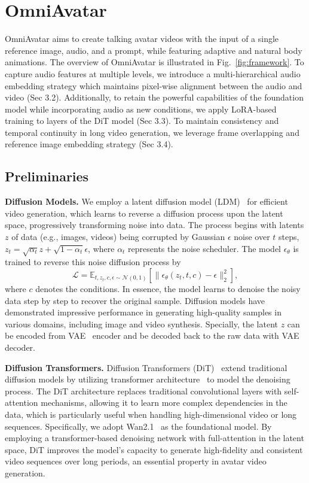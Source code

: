 \section{OmniAvatar}


OmniAvatar aims to create talking avatar videos with the input of a single reference image, audio, and a prompt, while featuring adaptive and natural body animations. The overview of OmniAvatar is illustrated in Fig.~\ref{fig:framework}. To capture audio features at multiple levels,  we introduce a multi-hierarchical audio embedding strategy which maintains pixel-wise alignment between the audio and video (Sec 3.2). Additionally, to retain the powerful capabilities of the foundation model while incorporating audio as new conditions, we apply LoRA-based training to layers of the DiT model (Sec 3.3). To maintain consistency and temporal continuity in long video generation, we leverage frame overlapping and reference image embedding strategy (Sec 3.4).


\subsection{Preliminaries}
\noindent\textbf{Diffusion Models.}
We employ a latent diffusion model (LDM)~\cite{rombach2022high} for efficient video generation, which learns to reverse a diffusion process upon the latent space, progressively transforming noise into data. The process begins with latents $z$ of data (e.g., images, videos) being corrupted by Gaussian $\epsilon$ noise over $t$ steps, $z_t = \sqrt{\alpha_t}z + \sqrt{1-\alpha_t}\epsilon$, where $\alpha_t$ represents the noise scheduler. The model $\epsilon_\theta$ is trained to reverse this noise diffusion process by 
$$
    \mathcal{L} = \mathbb{E}_{t, z_t, c, \epsilon \sim \mathcal{N}(0, 1)} \left[ \| \epsilon_\theta(z_t, t, c) - \epsilon \|^2_2 \right],
$$ where $c$ denotes the conditions. In essence, the model learns to denoise the noisy data step by step to recover the original sample. Diffusion models have demonstrated impressive performance in generating high-quality samples in various domains, including image and video synthesis. Specially, the latent $z$ can be encoded from VAE~\cite{kingma2013auto} encoder and be decoded back to the raw data with VAE decoder.


\noindent\textbf{Diffusion Transformers.}
Diffusion Transformers (DiT)~\cite{peebles2023scalable} extend traditional diffusion models by utilizing transformer architecture~\cite{vaswani2017attention} to model the denoising process. The DiT architecture replaces traditional convolutional layers with self-attention mechanisms, allowing it to learn more complex dependencies in the data, which is particularly useful when handling high-dimensional video or long sequences. Specifically, we adopt Wan2.1~\cite{wan2025wan} as the foundational model. By employing a transformer-based denoising network with full-attention in the latent space, DiT improves the model's capacity to generate high-fidelity and consistent video sequences over long periods, an essential property in avatar video generation.

